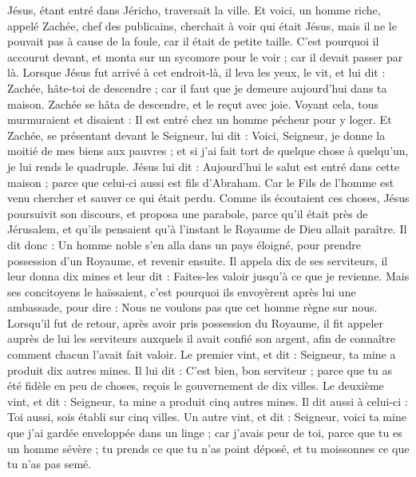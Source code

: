 \begin{multicols}{2}
\VerseOne{}Jésus, étant entré dans Jéricho, traversait la ville.
Et voici, un homme riche, appelé Zachée, chef des publicains, cherchait à voir qui était Jésus,
mais il ne le pouvait pas à cause de la foule, car il était de petite taille.
C'est pourquoi il accourut devant, et monta sur un sycomore pour le voir ; car il devait passer par là.
Lorsque Jésus fut arrivé à cet endroit-là, il leva les yeux, le vit, et lui dit : Zachée, hâte-toi de descendre ; car il faut que je demeure aujourd'hui dans ta maison.
Zachée se hâta de descendre, et le reçut avec joie.
Voyant cela, tous murmuraient et disaient : Il est entré chez un homme pécheur pour y loger.
Et Zachée, se présentant devant le Seigneur, lui dit : Voici, Seigneur, je donne la moitié de mes biens aux pauvres ; et si j'ai fait tort de quelque chose à quelqu'un, je lui rends le quadruple.
Jésus lui dit : Aujourd'hui le salut est entré dans cette maison ; parce que celui-ci aussi est fils d'Abraham.
Car le Fils de l'homme est venu chercher et sauver ce qui était perdu.
Comme ils écoutaient ces choses, Jésus poursuivit son discours, et proposa une parabole, parce qu'il était près de Jérusalem, et qu'ils pensaient qu'à l'instant le Royaume de Dieu allait paraître.
Il dit donc : Un homme noble s'en alla dans un pays éloigné, pour prendre possession d'un Royaume, et revenir ensuite.
Il appela dix de ses serviteurs, il leur donna dix mines et leur dit : Faites-les valoir jusqu'à ce que je revienne.
Mais ses concitoyens le haïssaient, c'est pourquoi ils envoyèrent après lui une ambassade, pour dire : Nous ne voulons pas que cet homme règne sur nous.
Lorsqu'il fut de retour, après avoir pris possession du Royaume, il fit appeler auprès de lui les serviteurs auxquels il avait confié son argent, afin de connaître comment chacun l'avait fait valoir.
Le premier vint, et dit : Seigneur, ta mine a produit dix autres mines.
Il lui dit : C'est bien, bon serviteur ; parce que tu as été fidèle en peu de choses, reçois le gouvernement de dix villes.
Le deuxième vint, et dit : Seigneur, ta mine a produit cinq autres mines.
Il dit aussi à celui-ci : Toi aussi, sois établi sur cinq villes.
Un autre vint, et dit : Seigneur, voici ta mine que j'ai gardée enveloppée dans un linge ;
car j'avais peur de toi, parce que tu es un homme sévère ; tu prends ce que tu n'as point déposé, et tu moissonnes ce que tu n'as pas semé.

\end{multicols}

